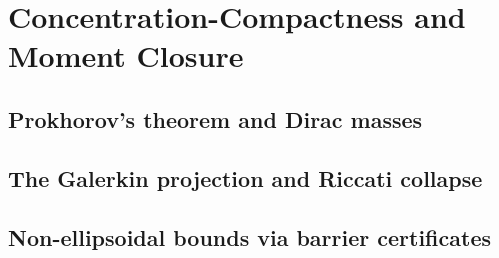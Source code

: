 
\section{Concentration-Compactness and Moment Closure}
\label{sec:concentration}

\subsection{Prokhorov's theorem and Dirac masses}
\label{sub:prokhorov_theorem_and_dirac_masses}

\subsection{The Galerkin projection and Riccati collapse}
\label{sub:galerkin_projection_and_riccati_collapse}

\subsection{Non-ellipsoidal bounds via barrier certificates}
\label{sub:non_ellipsoidal_bounds_via_barrier_certificates}
